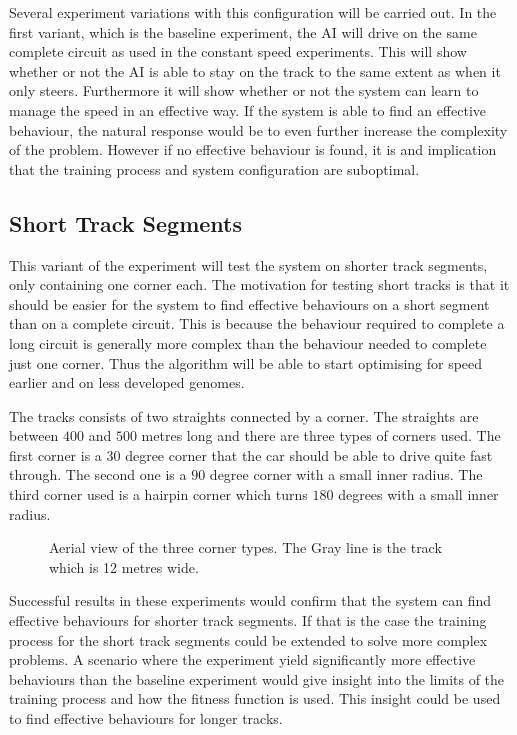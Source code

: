 Several experiment variations with this configuration will be carried out. In the first variant, which is the baseline experiment, the AI will drive on the same complete circuit as used in the constant speed experiments. This will show whether or not the AI is able to stay on the track to the same extent as when it only steers. Furthermore it will show whether or not the system can learn to manage the speed in an effective way. If the system is able to find an effective behaviour, the natural response would be to even further increase the complexity of the problem. However if no effective behaviour is found, it is and implication that the training process and system configuration are suboptimal. 

\subsection{Short Track Segments}
\label{subsec:shorttracksegment}
This variant of the experiment will test the system on shorter track segments, only containing one corner each. The motivation for testing short tracks is that it should be easier for the system to find effective behaviours on a short segment than on a complete circuit. This is because the behaviour required to complete a long circuit is generally more complex than the behaviour needed to complete just one corner. Thus the algorithm will be able to start optimising for speed earlier and on less developed genomes. 

The tracks consists of two straights connected by a corner. The straights are between $400$ and $500$ metres long and there are three types of corners used. The first corner is a $30$ degree corner that the car should be able to drive quite fast through. The second one is a $90$ degree corner with a small inner radius. The third corner used is a hairpin corner which turns $180$ degrees with a small inner radius. 
\begin{figure}[H]
    \centering
    \qquad
    \qquad

    \caption{Aerial view of the three corner types. The Gray line is the track which is 12 metres wide.}
\end{figure}
Successful results in these experiments would confirm that the system can find effective behaviours for shorter track segments. If that is the case the training process for the short track segments could be extended to solve more complex problems. A scenario where the experiment yield significantly more effective behaviours than the baseline experiment would give insight into the limits of the training process and how the fitness function is used. This insight could be used to find effective behaviours for longer tracks. 

